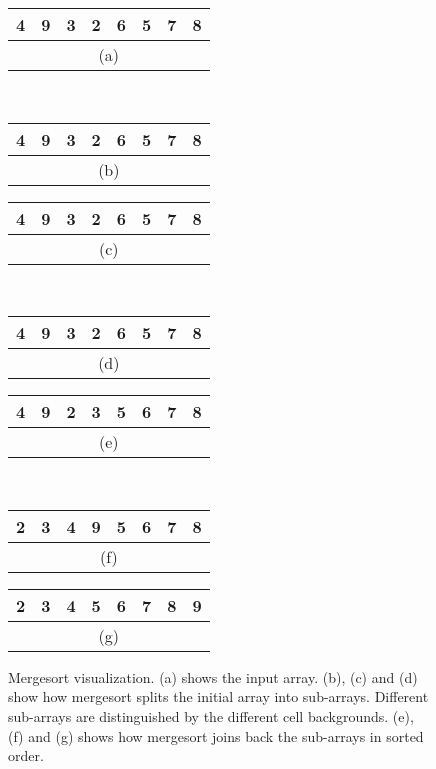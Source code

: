 \begin{figure}[!ht]
    \centering
    \begin{tabular}{|c|c|c|c|c|c|c|c|}
    \hline
    4 & 9 & 3 & 2 & 6 & 5 & 7 & 8 \\
    \hline
    \multicolumn{8}{c}{(a)} \\
    \end{tabular}
    \,
    \begin{tabular}{|c|c|c|c|c|c|c|c|}
    \hline
    4 & 9 & 3 & 2 & \cellcolor{lightgray}6 & \cellcolor{lightgray}5 & \cellcolor{lightgray}7 & \cellcolor{lightgray}8 \\
    \hline
    \multicolumn{8}{c}{(b)} \\
    \end{tabular}
    \break
    \begin{tabular}{|c|c|c|c|c|c|c|c|}
    \hline
    4 & 9 & \cellcolor{lightgray}3 & \cellcolor{lightgray}2 & 6 & 5 & \cellcolor{lightgray}7 & \cellcolor{lightgray}8 \\
    \hline
    \multicolumn{8}{c}{(c)} \\
    \end{tabular}
    \,
    \begin{tabular}{|c|c|c|c|c|c|c|c|}
    \hline
    4 & \cellcolor{lightgray}9 & 3 & \cellcolor{lightgray}2 & 6 & \cellcolor{lightgray}5 & 7 & \cellcolor{lightgray}8 \\
    \hline
    \multicolumn{8}{c}{(d)} \\
    \end{tabular}
    \break
    \begin{tabular}{|c|c|c|c|c|c|c|c|}
    \hline
    4 & 9 & \cellcolor{lightgray}2 & \cellcolor{lightgray}3 & 5 & 6 & \cellcolor{lightgray}7 & \cellcolor{lightgray}8 \\
    \hline
    \multicolumn{8}{c}{(e)} \\
    \end{tabular}
    \,
    \begin{tabular}{|c|c|c|c|c|c|c|c|}
    \hline
    2 & 3 & 4 & 9 & \cellcolor{lightgray}5 & \cellcolor{lightgray}6 & \cellcolor{lightgray}7 & \cellcolor{lightgray}8 \\
    \hline
    \multicolumn{8}{c}{(f)} \\
    \end{tabular}
    \break
    \begin{tabular}{|c|c|c|c|c|c|c|c|}
    \hline
    2 & 3 & 4 & 5 & 6 & 7 & 8 & 9 \\
    \hline
    \multicolumn{8}{c}{(g)} \\
    \end{tabular}
    
    \caption{Mergesort visualization. (a) shows the input array. (b), (c) and (d) show how mergesort splits the initial array into sub-arrays. Different sub-arrays are distinguished by the different cell backgrounds. (e), (f) and (g) shows how mergesort joins back the sub-arrays in sorted order.}
    \label{fig:mergesort_ex}
\end{figure}

